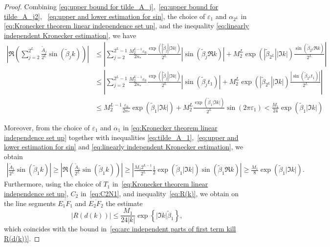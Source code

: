 \documentclass[11pt,reqno]{amsart}
\theoremstyle{definition}
\theoremstyle{remark}
\numberwithin{equation}{section}
\begin{document}
\begin{proof}
Combining \eqref{eq:upper bound for tilde_A_j},~\eqref{eq:upper bound for tilde_A_j2},~ \eqref{eq:upper and lower estimation for sin}, the choice of $\varepsilon_1$ and $\alpha_{2^L}$ in \eqref{eq:Kronecker theorem linear independence set up}, and the inequality \eqref{eq:linearly independent Kronecker estimation}, we have
\begin{equation}\label{eq:estimation of parts of main term of dk on line}
  \begin{aligned}
    \left| \Re\left(\sum_{j=2}^{2^L}\frac{\tilde{A}_j}{2^L}\sin{\left(\tilde{\beta}_j k\right)}\right) \right| &\leq \left| \sum_{j=2}^{2^L-1}\frac{M_2^{L-1}\varepsilon_0}{2n_{*}}\frac{\exp{\left(\left|\tilde{\beta}_j\right||\Im k|\right)} }{2^L}\left|\sin{\left(\tilde{\beta}_j\Re k\right)}\right|+M_2^L\exp{\left(\left|\tilde{\beta}_{2^L}\right| |\Im k|\right)}\frac{\sin{\left(\tilde{\beta}_{2^L}\Re k\right)} }{2^L} \right|\\
    &\leq \left| \sum_{j=2}^{2^L-1}\frac{M_2^{L-1}\varepsilon_0}{2n_{*}}\frac{\exp{\left(\left|\tilde{\beta}_j\right||\Im k|\right)} }{2^L}\left|\sin{\left(\tilde{\beta}_jt_1\right)}\right|+M_2^L\exp{\left(\left|\tilde{\beta}_{2^L}\right| |\Im k|\right)}\frac{\left|\sin{\left(\tilde{\beta}_{2^L}t_1\right)}\right| }{2^L} \right|\\
    &\leq M_2^{L-1}\frac{\varepsilon_0}{2n_{*}}\exp{\left( \tilde{\beta}_1 |\Im k|\right)}+M_2^L\frac{\exp{\left( \tilde{\beta}_1 |\Im k|\right)}}{2^L}\sin{\left(2\pi \varepsilon_1\right)}<\frac{M_1}{24}\exp{\left( \tilde{\beta}_1 |\Im k|\right)}
  \end{aligned}
\end{equation}

Moreover, from the choice of $\varepsilon_1$ and $\alpha_1$ in \eqref{eq:Kronecker theorem linear independence set up} together with inequalities \eqref{eq:tilde_A_1},~\eqref{eq:upper and lower estimation for sin} and \eqref{eq:linearly independent Kronecker estimation}, we obtain
\begin{equation}\label{eq:estimation of first term in main term on line independent case}
  \begin{aligned}
    \left| \frac{\tilde{A}_1}{2^L}\sin{\left(\tilde{\beta}_1 k\right)} \right|\geq \left| \Re\left(\frac{\tilde{A}_1}{2^L}\sin{\left(\tilde{\beta}_1 k\right)}\right) \right|\geq \left| \frac{M_1 2^{L-1}}{2^L}\frac{1}{2}\exp{\left(\tilde{\beta}_1|\Im k|\right)}\sin{\left( \tilde{\beta}_1\Re k \right)} \right|\geq \frac{M_1}{8}\exp{\left(\tilde{\beta}_1|\Im k|\right)}.~
  \end{aligned}
\end{equation}
Furthermore, using the choice of $T_1$ in~\eqref{eq:Kronecker theorem linear independence set up}, 
$C_2$ in~\eqref{eq:C2N1}, and inequality~\eqref{eq:R(k)}, we obtain on the line segments 
$\overline{E_1F_1}$ and $\overline{E_2F_2}$ the estimate
\begin{equation*}
\left|R(d(k))\right| \leq \frac{M_1}{24|k|}\exp{\left\{\left|\Im k\right|\tilde{\beta}_1\right\}},
\end{equation*}
which coincides with the bound in~\eqref{eq:arc independent parts of first term kill R(d(k))}.


\end{proof}
\end{document}
